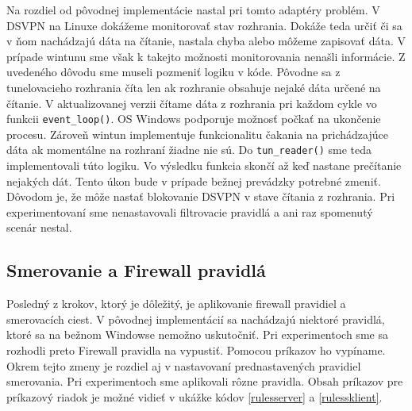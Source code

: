 Na rozdiel od pôvodnej implementácie nastal pri tomto adaptéry problém. V DSVPN na Linuxe dokážeme monitorovať stav rozhrania. Dokáže teda určiť či sa v ňom nachádzajú dáta na čítanie, nastala chyba alebo môžeme zapisovať dáta. V prípade wintunu sme však k takejto možnosti monitorovania nenašli informácie. Z uvedeného dôvodu sme museli pozmeniť logiku v kóde. Pôvodne sa z tunelovacieho rozhrania číta len ak rozhranie obsahuje nejaké dáta určené na čítanie. V aktualizovanej verzii čítame dáta z rozhrania pri každom cykle vo funkcii \lstinline|event_loop()|. OS Windows podporuje možnosť počkať na ukončenie procesu. Zároveň wintun implementuje funkcionalitu čakania na prichádzajúce dáta ak momentálne na rozhraní žiadne nie sú. Do \lstinline|tun_reader()| sme teda implementovali túto logiku. Vo výsledku funkcia skončí až keď nastane prečítanie nejakých dát. Tento úkon bude v prípade bežnej prevádzky potrebné zmeniť. Dôvodom je, že môže nastať blokovanie DSVPN v stave čítania z rozhrania. Pri experimentovaní sme nenastavovali filtrovacie pravidlá a ani raz spomenutý scenár nestal. 

\subsection{Smerovanie a Firewall pravidlá}
Posledný z krokov, ktorý je dôležitý, je aplikovanie firewall pravidiel a smerovacích ciest. V pôvodnej implementácií sa nachádzajú niektoré pravidlá, ktoré sa na bežnom Windowse nemožno uskutočniť. Pri experimentoch sme sa rozhodli preto Firewall pravidla na vypustiť. Pomocou príkazov ho vypíname. Okrem tejto zmeny je rozdiel aj v nastavovaní prednastavených pravidiel smerovania. Pri experimentoch sme aplikovali rôzne pravidla. Obsah príkazov pre príkazový riadok je možné vidieť v ukážke kódov \ref{rulesserver} a \ref{rulessklient}.


